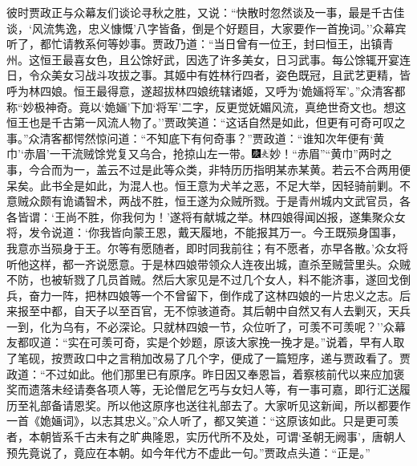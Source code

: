 彼时贾政正与众幕友们谈论寻秋之胜，又说：``快散时忽然谈及一事，最是千古佳谈，`风流隽逸，忠义慷慨'八字皆备，倒是个好题目，大家要作一首挽词。''众幕宾听了，都忙请教系何等妙事。贾政乃道：``当日曾有一位王，封曰恒王，出镇青州。这恒王最喜女色，且公馀好武，因选了许多美女，日习武事。每公馀辄开宴连日，令众美女习战斗攻拔之事。其姬中有姓林行四者，姿色既冠，且武艺更精，皆呼为林四娘。恒王最得意，遂超拔林四娘统辖诸姬，又呼为`姽婳将军'。''众清客都称``妙极神奇。竟以`姽婳'下加`将军'二字，反更觉妩媚风流，真绝世奇文也。想这恒王也是千古第一风流人物了。''贾政笑道：``这话自然是如此，但更有可奇可叹之事。''众清客都愕然惊问道：``不知底下有何奇事？''贾政道：``谁知次年便有`黄巾'`赤眉'一干流贼馀党复又乌合，抢掠山左一带。{\includegraphics[width=3mm]{../Images/00004}\includegraphics[width=3mm]{../Images/00012}\footnotesize \kaishu 妙！``赤眉''``黄巾''两时之事，今合而为一，盖云不过是此等众类，非特历历指明某赤某黄。若云不合两用便呆矣。此书全是如此，为混人也。}恒王意为犬羊之恶，不足大举，因轻骑前剿。不意贼众颇有诡谲智术，两战不胜，恒王遂为众贼所戮。于是青州城内文武官员，各各皆谓：`王尚不胜，你我何为！'遂将有献城之举。林四娘得闻凶报，遂集聚众女将，发令说道：`你我皆向蒙王恩，戴天履地，不能报其万一。今王既殒身国事，我意亦当殒身于王。尔等有愿随者，即时同我前往；有不愿者，亦早各散。'众女将听他这样，都一齐说愿意。于是林四娘带领众人连夜出城，直杀至贼营里头。众贼不防，也被斩戮了几员首贼。然后大家见是不过几个女人，料不能济事，遂回戈倒兵，奋力一阵，把林四娘等一个不曾留下，倒作成了这林四娘的一片忠义之志。后来报至中都，自天子以至百官，无不惊骇道奇。其后朝中自然又有人去剿灭，天兵一到，化为乌有，不必深论。只就林四娘一节，众位听了，可羡不可羡呢？''众幕友都叹道：``实在可羡可奇，实是个妙题，原该大家挽一挽才是。''说着，早有人取了笔砚，按贾政口中之言稍加改易了几个字，便成了一篇短序，递与贾政看了。贾政道：``不过如此。他们那里已有原序。昨日因又奉恩旨，着察核前代以来应加褒奖而遗落未经请奏各项人等，无论僧尼乞丐与女妇人等，有一事可嘉，即行汇送履历至礼部备请恩奖。所以他这原序也送往礼部去了。大家听见这新闻，所以都要作一首《姽婳词》，以志其忠义。''众人听了，都又笑道：``这原该如此。只是更可羡者，本朝皆系千古未有之旷典隆恩，实历代所不及处，可谓`圣朝无阙事'，唐朝人预先竟说了，竟应在本朝。如今年代方不虚此一句。''贾政点头道：``正是。''

